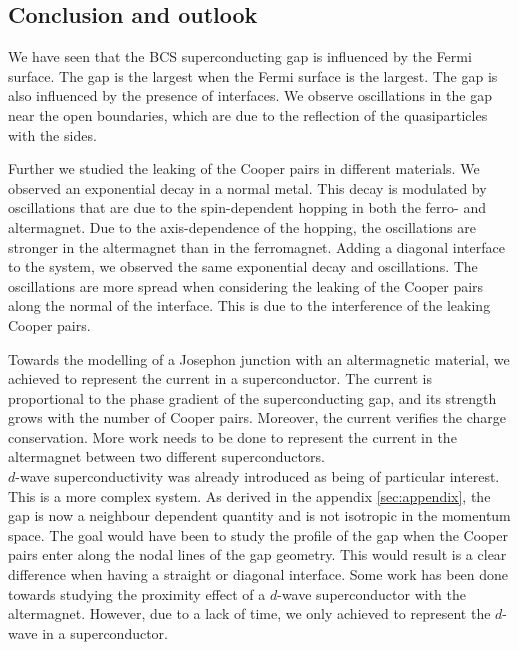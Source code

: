 \documentclass[..\main.tex]{subfile}
\begin{document}
\subsection{Conclusion and outlook}
We have seen that the BCS superconducting gap is influenced by the Fermi surface. The gap is the largest when the Fermi surface is the largest.
The gap is also influenced by the presence of interfaces. We observe oscillations in the gap near the open boundaries, which are due to the reflection
of the quasiparticles with the sides.

Further we studied the leaking of the Cooper pairs in different materials. We observed an exponential decay in a normal metal.
This decay is modulated by oscillations that are due to the spin-dependent hopping in both the ferro- and altermagnet.
Due to the axis-dependence of the hopping, the oscillations are stronger in the altermagnet than in the ferromagnet.
Adding a diagonal interface to the system, we observed the same exponential decay and oscillations. The oscillations are more spread when considering
the leaking of the Cooper pairs along the normal of the interface. This is due to the interference of the leaking Cooper pairs.

Towards the modelling of a Josephon junction with an altermagnetic material, we achieved to represent the current in a superconductor.
The current is proportional to the phase gradient of the superconducting gap, and its strength grows with the number of Cooper pairs.
Moreover, the current verifies the charge conservation.
More work needs to be done to represent the current in the altermagnet between two different superconductors.\\

$d$-wave superconductivity was already introduced as being of particular interest. This is a more complex system.
As derived in the appendix \ref{sec:appendix}, the gap is now a neighbour dependent quantity and is not isotropic in the momentum space. The goal would have been 
to study the profile of the gap when the Cooper pairs enter along the nodal lines of the gap geometry. This
would result is a clear difference when having a straight or diagonal interface. 
 Some work has been done towards studying the
proximity effect of a $d$-wave superconductor with the altermagnet. However, due to a lack of time, we only achieved to represent the $d$-wave in a superconductor.
\end{document}
